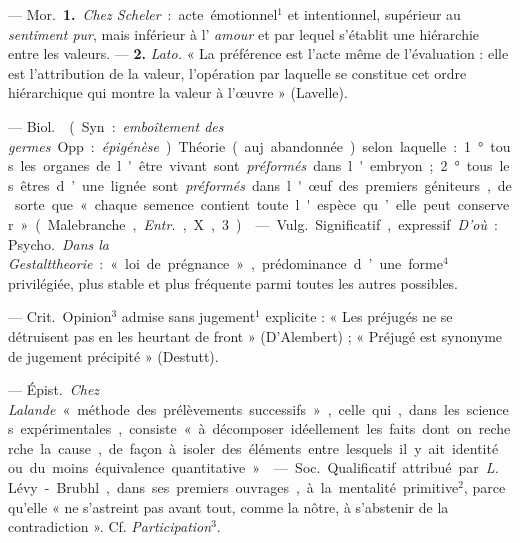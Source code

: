\begin{itemize}[leftmargin=1cm, label=, itemsep=1pt]
 — \si{Mor.} {\bf 1.} {\it Chez Scheler} : acte émotionnel$^1$
et intentionnel, supérieur au {\it sentiment pur}, mais inférieur à l'{\it
amour} et par lequel s'établit une hiérarchie entre les valeurs. — {\bf 2.}
{\it Lato.} « La préférence est l'acte même de l'évaluation : elle est
l’attribution de la valeur, l’opération par laquelle se constitue cet ordre
hiérarchique qui montre la valeur à l’œuvre » (Lavelle).

 — \si{Biol.}  (Syn. : {\it emboîtement des
germes}. Opp. : {\it épigénèse}). Théorie (auj. abandonnée) selon laquelle :
1° tous les organes de l'être vivant sont {\it préformés} dans l'embryon; 2°
tous les êtres d’une lignée sont {\it préformés} dans l'œuf des premiers
géniteurs, de sorte que « chaque semence contient toute l'espèce qu’elle peut
conserver » (Malebranche, {\it Entr.}, X, 3).

 — \si{Vulg.} Significatif, expressif. {\it D'où} : \si{Psycho.}
{\it Dans la Gestalttheorie} :
« loi de prégnance », prédominance d’une forme$^4$ privilégiée, plus stable
et plus fréquente parmi toutes les autres possibles.

 — \si{Crit.} Opinion$^3$ admise sans jugement$^1$ explicite : «
Les préjugés ne se détruisent pas en les heurtant de front » (D’Alembert) ; «
Préjugé est synonyme de jugement précipité » (Destutt).

 — \si{Épist.} {\it Chez Lalande} « méthode des prélèvements
successifs », celle qui, dans les sciences expérimentales, consiste « à
décomposer idéellement les faits dont on recherche la cause, de façon à
isoler des éléments entre lesquels il y ait identité ou du moins équivalence
quantitative ».

 — \si{Soc.} Qualificatif attribué par {\it L.} Lévy-Brubhl,
dans ses premiers ouvrages, à la mentalité primitive$^2$, parce qu'elle « ne
s’astreint pas avant tout, comme la nôtre, à s'abstenir de la contradiction
». Cf. {\it Participation}$^3$.


\end{itemize}
